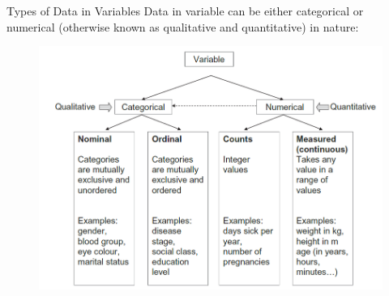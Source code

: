 \documentclass[
  ignorenonframetext,
]{beamer}
\begin{document}
\begin{frame}{Types of Data in Variables}
\protect\hypertarget{types-of-data-in-variables}{}
Data in variable can be either {categorical} or {numerical} (otherwise
known as qualitative and quantitative) in nature:

\begin{figure}

{\centering \includegraphics{images_slides/types.png}

}

\end{figure}
\end{frame}
\end{document}

